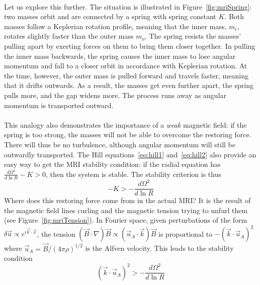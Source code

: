 \\
Let us explore this further. The situation is illustrated in Figure~\ref{fig:mriSpring}: two masses orbit and are connected by a spring with spring constant $K$. Both masses follow a Keplerian rotation profile, meaning that the inner mass, $m_i$, rotates slightly faster than the outer mass $m_o$. The spring resists the masses' pulling apart by exerting forces on them to bring them closer together. In pulling the inner mass backwards, the spring causes the inner mass to lose angular momentum and fall to a closer orbit in accordance with Keplerian rotation. At the time, however, the outer mass is pulled forward and travels faster, meaning that it drifts outwards. As a result, the masses get even further apart, the spring pulls more, and the gap widens more. The process runs away as angular momentum is transported outward. \\
\\
This analogy also demonstrates the importance of a \textit{weak} magnetic field: if the spring is too strong, the masses will not be able to overcome the restoring force. There will thus be no turbulence, although angular momentum will still be outwardly transported. The Hill equations~\ref{eq:hill1} and~\ref{eq:hill2} also provide an easy way to get the MRI stability condition: if the radial equation has $\frac{d\Omega^2}{d\ln R}-K>0$, then the system is stable. The stability criterion is thus
\begin{equation*}
-K>-\frac{d\Omega^2}{d\ln R}
\end{equation*}
Where does this restoring force come from in the actual MRI? It is the result of the magnetic field lines curling and the magnetic tension trying to unfurl them (see Figure~\ref{fig:mriTension}). In Fourier space, given perturbations of the form $\delta\vec u\propto e^{i\vec k\cdot\vec x}$, the tension $(\vec B\cdot\nabla)\vec B\propto (\vec u_A\cdot \vec k)\vec B$ is proportional to $-(\vec k\cdot\vec u_A)^2$ where $\vec u_A=\vec B/(4\pi\rho)^{1/2}$ is the Alfven velocity. This leads to the stability condition
\begin{equation}
(\vec k\cdot\vec u_A)^2 >-\frac{d\Omega^2}{d\ln R} \label{eq:mriStable}
\end{equation}
